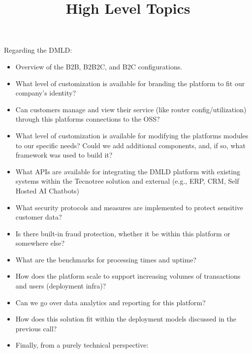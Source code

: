 \documentclass[
]{article}
\title{High Level Topics}
\author{}
\date{}
\providecommand{\tightlist}{%
  \setlength{\itemsep}{0pt}\setlength{\parskip}{0pt}}
\begin{document}
\maketitle

Regarding the DMLD:

\begin{itemize}
\tightlist
\item
  Overview of the B2B, B2B2C, and B2C configurations.
\item
  What level of customization is available for branding the platform to
  fit our company's identity?
\item
  Can customer\textquotesingle s manage and view their service (like
  router config/utilization) through this platform\textquotesingle s
  connections to the OSS?
\item
  What level of customization is available for modifying the
  platform\textquotesingle s modules to our specific needs? Could we add
  additional components, and, if so, what framework was used to build
  it?
\item
  What APIs are available for integrating the DMLD platform with
  existing systems within the Tecnotree solution and external (e.g.,
  ERP, CRM, Self Hosted AI Chatbots)
\item
  What security protocols and measures are implemented to protect
  sensitive customer data?
\item
  Is there built-in fraud protection, whether it be within this platform
  or somewhere else?
\item
  What are the benchmarks for processing times and uptime?
\item
  How does the platform scale to support increasing volumes of
  transactions and users (deployment infra)?
\item
  Can we go over data analytics and reporting for this platform?
\item
  How does this solution fit within the deployment models discussed in
  the previous call?
\item
  Finally, from a purely technical perspective:


\end{itemize}
\end{document}
